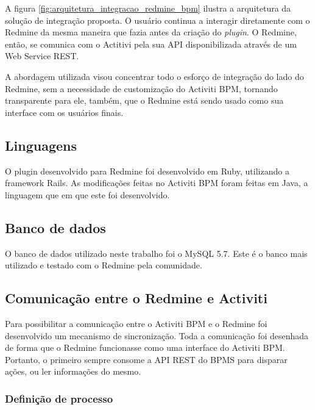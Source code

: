 A figura \ref{fig:arquitetura_integracao_redmine_bpm} ilustra a arquitetura da solução de integração proposta. O usuário continua a interagir diretamente com o Redmine da mesma maneira que fazia antes da criação do \textit{plugin}. O Redmine, então, se comunica com o Actitivi pela sua API disponibilizada através de um Web Service REST.

A abordagem utilizada visou concentrar todo o esforço de integração do lado do Redmine, sem a necessidade de customização do Activiti BPM, tornando transparente para ele, também, que o Redmine está sendo usado como sua interface com os usuários finais.
    

\subsection{Linguagens}\label{sec:integracao_redmine_activiti_implementacao_detalhes_desenvolvimento_linguagens}

O plugin desenvolvido para Redmine foi desenvolvido em Ruby\cite{ruby-lang}, utilizando a framework Rails\cite{rails}.
As modificações feitas no Activiti BPM foram feitas em Java, a linguagem que em que este foi desenvolvido.

\subsection{Banco de dados}\label{sec:integracao_redmine_activiti_implementacao__bd}

O banco de dados utilizado neste trabalho foi o MySQL 5.7. Este é o banco mais utilizado e testado com o Redmine pela comunidade.

\subsection{Comunicação entre o Redmine e Activiti}\label{sec:integracao_redmine_activiti_implementacao_sincronizacao}

Para possibilitar a comunicação entre o Activiti BPM e o Redmine foi desenvolvido um mecanismo de sincronização.
Toda a comunicação foi desenhada de forma que o Redmine funcionasse como uma interface do Activiti BPM. Portanto, o primeiro sempre consome a API REST do BPMS para disparar ações, ou ler informações do mesmo.

\subsubsection{Definição de processo}

